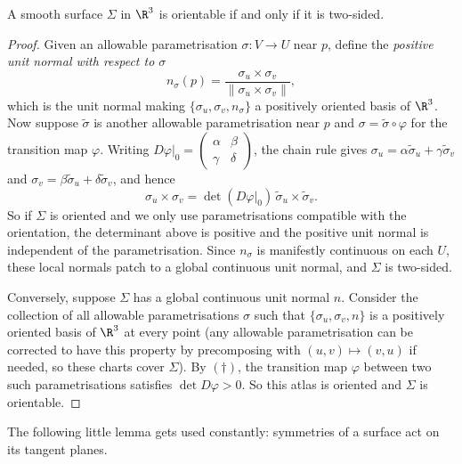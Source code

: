 \begin{lemma}
    A smooth surface $\Sigma$ in $\R^3$ is orientable if and only if it is two-sided.
\end{lemma}
\begin{proof}
    Given an allowable parametrisation $\sigma: V \rightarrow U$ near $p$, define the \emph{positive unit normal with respect to $\sigma$}
    $$
    n_{\sigma}(p) = \frac{\sigma_u \times \sigma_v}{\|\sigma_u \times \sigma_v\|},
    $$
    which is the unit normal making $\{\sigma_u, \sigma_v, n_\sigma\}$ a positively oriented basis of $\R^3$. Now suppose $\tilde{\sigma}$ is another allowable parametrisation near $p$ and $\sigma = \tilde{\sigma} \circ \varphi$ for the transition map $\varphi$. Writing $\left.D\varphi\right|_0 = \begin{pmatrix} \alpha & \beta \\ \gamma & \delta\end{pmatrix}$, the chain rule gives $\sigma_u = \alpha \tilde{\sigma}_u + \gamma \tilde{\sigma}_v$ and $\sigma_v = \beta \tilde{\sigma}_u + \delta \tilde{\sigma}_v$, and hence
    \begin{equation}
    \sigma_u \times \sigma_v = \det\left(\left.D\varphi\right|_0\right) \, \tilde{\sigma}_u \times \tilde{\sigma}_v. \tag{$\dagger$}
    \end{equation}
    So if $\Sigma$ is oriented and we only use parametrisations compatible with the orientation, the determinant above is positive and the positive unit normal is independent of the parametrisation. Since $n_\sigma$ is manifestly continuous on each $U$, these local normals patch to a global continuous unit normal, and $\Sigma$ is two-sided.

    Conversely, suppose $\Sigma$ has a global continuous unit normal $n$. Consider the collection of all allowable parametrisations $\sigma$ such that $\{\sigma_u, \sigma_v, n\}$ is a positively oriented basis of $\R^3$ at every point (any allowable parametrisation can be corrected to have this property by precomposing with $(u, v) \mapsto (v, u)$ if needed, so these charts cover $\Sigma$). By $(\dagger)$, the transition map $\varphi$ between two such parametrisations satisfies $\det D\varphi > 0$. So this atlas is oriented and $\Sigma$ is orientable.
\end{proof}

The following little lemma gets used constantly: symmetries of a surface act on its tangent planes.

